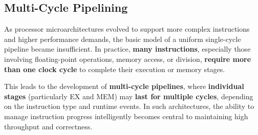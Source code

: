 \subsection{Multi-Cycle Pipelining}\label{subsection: Multi-Cycle Pipelining}

As processor microarchitectures evolved to support more complex instructions and higher performance demands, the basic model of a uniform single-cycle pipeline became insufficient. In practice, \textbf{many instructions}, especially those involving floating-point operations, memory access, or division, \textbf{require more than one clock cycle} to complete their execution or memory stages.

\highspace
This leads to the development of \textbf{multi-cycle pipelines}, where \textbf{individual stages} (particularly EX and MEM) may \textbf{last for multiple cycles}, depending on the instruction type and runtime events. In such architectures, the ability to manage instruction progress intelligently becomes central to maintaining high throughput and correctness.

